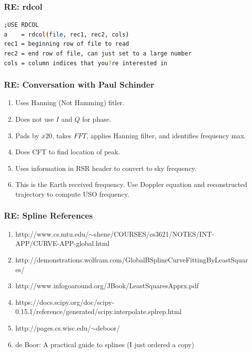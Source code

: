 \documentclass[crop=false,class=book]{standalone}
\begin{document}
\subsubsection{\footnotesize RE: rdcol}
\begin{lstlisting}[language = bash]
;USE RDCOL
a    = rdcol(file, rec1, rec2, cols)
rec1 = beginning row of file to read
rec2 = end row of file, can just set to a large number
cols = column indices that you?re interested in 
\end{lstlisting}
\subsubsection{\footnotesize RE: Conversation with Paul Schinder}
\begin{enumerate}
\item Uses Hanning (Not Hamming) fitler.
\item Does not use $I$ and $Q$ for phase.
\item Pads by $x20$, takes $FFT$, applies Hanning filter, and identifies frequency max.
\item Does CFT to find location of peak.
\item Uses information in RSR header to convert to sky frequency.
\item This is the Earth received frequency. Use Doppler equation and reconstructed trajectory to compute USO frequency.
\end{enumerate}
\subsubsection{\footnotesize RE: Spline References}
\begin{enumerate}
\item http://www.cs.mtu.edu/$\sim$shene/COURSES/cs3621/NOTES/INT-APP/CURVE-APP-global.html
\item http://demonstrations.wolfram.com/GlobalBSplineCurveFittingByLeastSquares/
\item http://www.infogoaround.org/JBook/LeastSquaresApprx.pdf
\item https://docs.scipy.org/doc/scipy-0.15.1/reference/generated/scipy.interpolate.splrep.html
\item http://pages.cs.wisc.edu/$\sim$deboor/
\item de Boor: A practical guide to splines (I just ordered a copy)
\end{enumerate} 
\end{document}
